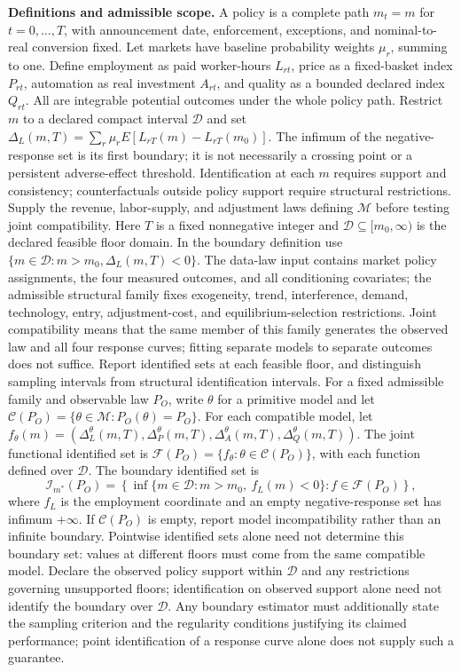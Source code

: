 \documentclass[11pt,a4paper]{article}
\begin{document}
\textbf{Definitions and admissible scope.} A policy is a complete path \(m_t=m\) for \(t=0,\ldots,T\), with announcement date, enforcement, exceptions, and nominal-to-real conversion fixed. Let markets have baseline probability weights \(\mu_r\), summing to one. Define employment as paid worker-hours \(L_{rt}\), price as a fixed-basket index \(P_{rt}\), automation as real investment \(A_{rt}\), and quality as a bounded declared index \(Q_{rt}\). All are integrable potential outcomes under the whole policy path. Restrict \(m\) to a declared compact interval \(\mathcal D\) and set \(\Delta_L(m,T)=\sum_r\mu_rE[L_{rT}(m)-L_{rT}(m_0)]\). The infimum of the negative-response set is its first boundary; it is not necessarily a crossing point or a persistent adverse-effect threshold. Identification at each \(m\) requires support and consistency; counterfactuals outside policy support require structural restrictions. Supply the revenue, labor-supply, and adjustment laws defining \(\mathcal M\) before testing joint compatibility. Here \(T\) is a fixed nonnegative integer and \(\mathcal D\subseteq[m_0,\infty)\) is the declared feasible floor domain. In the boundary definition use \(\{m\in\mathcal D:m>m_0,\Delta_L(m,T)<0\}\). The data-law input contains market policy assignments, the four measured outcomes, and all conditioning covariates; the admissible structural family fixes exogeneity, trend, interference, demand, technology, entry, adjustment-cost, and equilibrium-selection restrictions. Joint compatibility means that the same member of this family generates the observed law and all four response curves; fitting separate models to separate outcomes does not suffice. Report identified sets at each feasible floor, and distinguish sampling intervals from structural identification intervals. For a fixed admissible family and observable law \(P_O\), write \(\theta\) for a primitive model and let \(\mathcal C(P_O)=\{\theta\in\mathcal M:P_O(\theta)=P_O\}\). For each compatible model, let \(f_\theta(m)=(\Delta_L^\theta(m,T),\Delta_P^\theta(m,T),\Delta_A^\theta(m,T),\Delta_Q^\theta(m,T))\). The joint functional identified set is \(\mathcal F(P_O)=\{f_\theta:\theta\in\mathcal C(P_O)\}\), with each function defined over \(\mathcal D\). The boundary identified set is
\[
 \mathcal I_{m^*}(P_O)=\left\{\inf\{m\in\mathcal D:m>m_0,\ f_L(m)<0\}:f\in\mathcal F(P_O)\right\},
\]
where \(f_L\) is the employment coordinate and an empty negative-response set has infimum \(+\infty\). If \(\mathcal C(P_O)\) is empty, report model incompatibility rather than an infinite boundary. Pointwise identified sets alone need not determine this boundary set: values at different floors must come from the same compatible model. Declare the observed policy support within \(\mathcal D\) and any restrictions governing unsupported floors; identification on observed support alone need not identify the boundary over \(\mathcal D\). Any boundary estimator must additionally state the sampling criterion and the regularity conditions justifying its claimed performance; point identification of a response curve alone does not supply such a guarantee.
\end{document}
